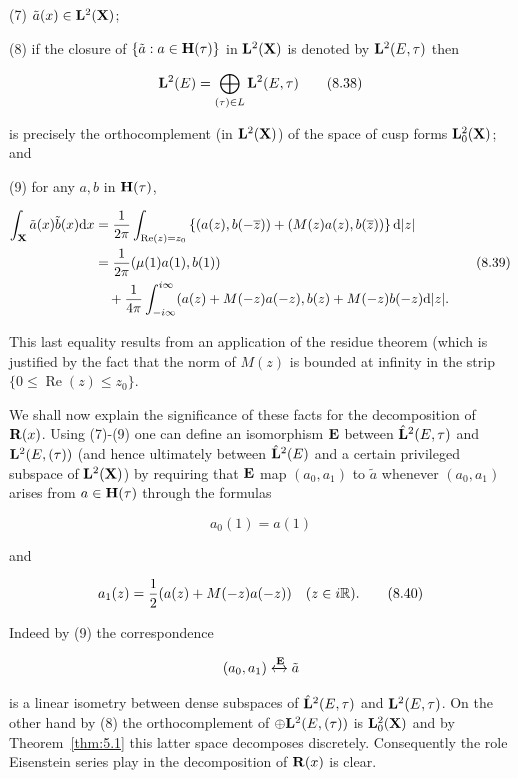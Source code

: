 (7) $\tilde{a}(x) \in \mathbf{L}^{2}(\mathbf{X})$;

(8) if the closure of $\{\tilde{a}: a \in \mathbf{H}(\tau)\}$ in $\mathbf{L}^{2}(\mathbf{X})$ is denoted by $\mathbf{L}^{2}(E,\tau)$ then

\begin{equation}\label{eq:8.38}
\mathbf{L}^{2}(E) = \bigoplus_{(\tau) \in L} \mathbf{L}^{2}(E,\tau)\tag{8.38}
\end{equation}

is precisely the orthocomplement (in $\mathbf{L}^{2}(\mathbf{X})$) of the space of cusp forms $\mathbf{L}_{0}^{2}(\mathbf{X})$; and

(9) for any $a, b$ in $\mathbf{H}(\tau)$,

\begin{equation}\label{eq:8.39}
\begin{aligned}
\int_{\mathbf{X}} \tilde{a}(x)\tilde{b}(x) \mathrm{d} x
&= \frac{1}{2\pi}\int_{\operatorname{Re}(z) = z_{0}} \left\{(a(z), b(-\overline{z})) + (M(z)a(z), b(\overline{z}))\right\} \mathrm{d}|z|\\
&= \frac{1}{2\pi}(\mu(1)a(1), b(1))\\
&\quad + \frac{1}{4\pi}\int_{-i\infty}^{i\infty} (a(z) + M(-z)a(-z), b(z) + M(-z)b(-z) \mathrm{d}|z|.
\end{aligned}\tag{8.39}
\end{equation}

This last equality results from an application of the residue theorem (which is justified by the fact that the norm of $M(z)$ is bounded at infinity in the strip $\{0 \leq \operatorname{Re}(z) \leq z_{0}\}$.

We shall now explain the significance of these facts for the decomposition of $\mathbf{R}(x)$. Using (7)-(9) one can define an isomorphism $\mathbf{E}$ between $\hat{\mathbf{L}}^{2}(E,\tau)$ and $\mathbf{L}^{2}(E,(\tau))$ (and hence ultimately between $\hat{\mathbf{L}}^{2}(E)$ and a certain privileged subspace of $\mathbf{L}^{2}(\mathbf{X})$) by requiring that $\mathbf{E}$ map $(a_{0},a_{1})$ to $\tilde{a}$ whenever $(a_{0},a_{1})$ arises from $a \in \mathbf{H}(\tau)$ through the formulas

\[
a_{0}(1) = a(1)
\]

and

\begin{equation}\label{eq:8.40}
a_{1}(z) = \frac{1}{2}(a(z) + M(-z)a(-z)) \quad (z \in i\mathbb{R}).\tag{8.40}
\end{equation}

Indeed by (9) the correspondence

\[
(a_{0}, a_{1}) \xleftrightarrow{\mathbf{E}} \tilde{a}
\]

is a linear isometry between dense subspaces of $\hat{\mathbf{L}}^{2}(E,\tau)$ and $\mathbf{L}^{2}(E,\tau)$. On the other hand by (8) the orthocomplement of $\oplus\mathbf{L}^{2}(E,(\tau))$ is $\mathbf{L}_{0}^{2}(\mathbf{X})$ and by Theorem~\ref{thm:5.1} this latter space decomposes discretely. Consequently the role Eisenstein series play in the decomposition of $\mathbf{R}(x)$ is clear.

